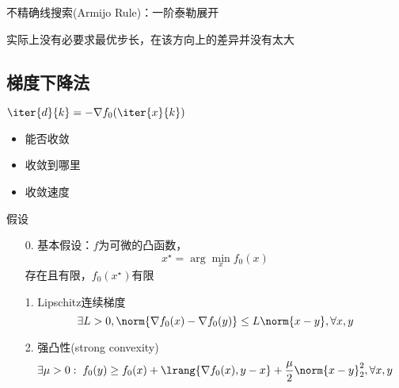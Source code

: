 不精确线搜索(Armijo Rule)：一阶泰勒展开

实际上没有必要求最优步长，在该方向上的差异并没有太大

\subsection{梯度下降法}
$\iter{d}{k}=-\nabla f_0(\iter{x}{k})$
\begin{itemize}
    \item 能否收敛
    \item 收敛到哪里
    \item 收敛速度
\end{itemize}

假设
\begin{itemize}
    \item[0.] 基本假设：$f$为可微的凸函数，
    \[x^\star=\arg\min_x f_0(x)\]
    存在且有限，$f_0(x^\star)$有限
    \item[1.] Lipschitz连续梯度
    \[\exists L>0,\norm{\nabla f_0(x)-\nabla f_0(y)}\leq L\norm{x-y},\forall x,y\]
    \item[2.] 强凸性(strong convexity)
    \[\exists\mu>0:\;f_0(y)\geq f_0(x)+\lrang{\nabla f_0(x),y-x}+\frac{\mu}{2}\norm{x-y}_2^2,\forall x,y\]
\end{itemize}